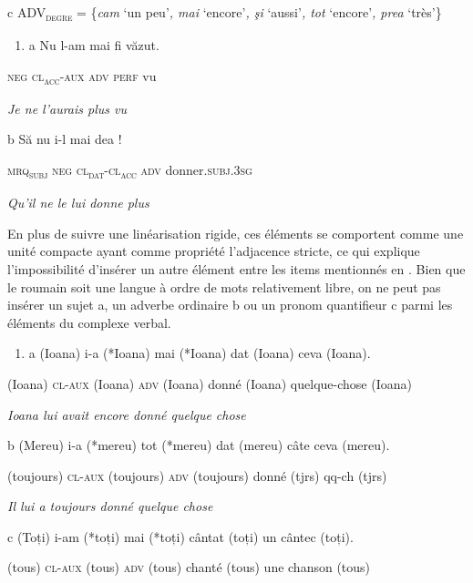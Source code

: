   c  ADV\textsc{\textsubscript{degre}} = \{\textit{cam} `un peu'\textit{, mai} `encore'\textit{, şi} `aussi'\textit{, tot} `encore'\textit{, prea} `très'\}


\begin{enumerate}
\item a  Nu  l-am  mai fi  văzut.


\end{enumerate}
    \textsc{neg cl}\textsc{\textsubscript{acc}}\textsc{-aux adv perf} vu

    \textit{Je ne l'aurais plus vu}  

  b  Să     nu  i-l     mai  dea ! 

    \textsc{mrq}\textsc{\textsubscript{subj}}\textsc{ neg cl}\textsc{\textsubscript{dat}}\textsc{-cl}\textsc{\textsubscript{acc}}\textsc{ adv} donner.\textsc{subj.3sg}

    \textit{Qu'il ne le lui donne plus}  

En plus de suivre une linéarisation rigide, ces éléments se comportent comme une unité compacte ayant comme propriété l'adjacence stricte, ce qui explique l'impossibilité d'insérer un autre élément entre les items mentionnés en . Bien que le roumain soit une langue à ordre de mots relativement libre, on ne peut pas insérer un sujet a, un adverbe ordinaire b ou un pronom quantifieur c parmi les éléments du complexe verbal. 


\begin{enumerate}
\item \label{bkm:Ref276918916}a  (Ioana)  i-a  (*Ioana)  mai  (*Ioana)  dat  (Ioana)  ceva  (Ioana).


\end{enumerate}
(Ioana)  \textsc{cl-aux } (Ioana)  \textsc{adv  (}Ioana)  donné  (Ioana)  quelque-chose (Ioana)

    \textit{Ioana lui avait encore donné quelque chose}  

  b  (Mereu)  i-a  (*mereu)  tot  (*mereu)  dat  (mereu)  câte ceva  (mereu).

    (toujours)  \textsc{cl-aux  (}toujours)  \textsc{adv } (toujours)  donné  (tjrs)  qq-ch  (tjrs)

    \textit{Il lui a toujours donné quelque chose}

  c  (Toți)  i-am  (*toți)  mai  (*toți)  cântat  (toți)  un  cântec  (toți).

    (tous)  \textsc{cl-aux } (tous)  \textsc{adv } (tous)  chanté  (tous)  une  chanson  (tous)


